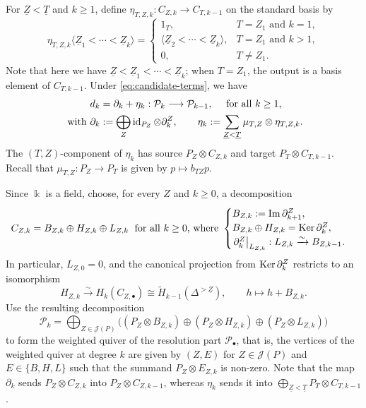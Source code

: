 \documentclass[a4paper,leqno]{amsart}
\begin{document}
For $\underline{Z}<\underline{T}$ and $k\geq1$, define $\eta_{T,Z,k}:C_{Z,k}\to C_{T,k-1}$ on the standard basis by
\[
 \eta_{T,Z,k}\langle \underline{Z}_1<\cdots<\underline{Z}_k\rangle
 =
 \begin{cases}
  1_T,&T=Z_1\text{ and }k=1,\\
  \langle \underline{Z}_2<\cdots<\underline{Z}_k\rangle,
       &T=Z_1\text{ and }k>1,\\
  0,&T\neq Z_1.
 \end{cases}
\]
Note that here we have $\underline{Z}<\underline{Z}_1<\cdots<\underline{Z}_k$; when $T=Z_1$, the output is a basis element of $C_{T,k-1}$. 
Under \eqref{eq:candidate-terms},  we have
\[
 \begin{aligned}
 d_k&=\partial_k+\eta_k:
       \mathcal P_k\longrightarrow\mathcal P_{k-1}, \quad \text{ for all $k\ge 1$,}\\
 \text{ with } \partial_k&:=\bigoplus_Z\operatorname{id}_{P_Z}\otimes\partial^Z_k,
 \qquad
 \eta_k:=\sum_{\underline{Z}<\underline{T}}\mu_{T,Z}\otimes\eta_{T,Z,k}.
 \end{aligned}
\]
The $(T,Z)$-component of $\eta_k$ has source $P_Z\otimes C_{Z,k}$ and target $P_T\otimes C_{T,k-1}$. Recall that $\mu_{T,Z}:P_Z\to P_T$ is given by $p\mapsto b_{TZ}p$.


Since $\Bbbk$ is a field, choose, for every $Z$ and $k\geq0$, a decomposition
\begin{equation}
 C_{Z,k}=B_{Z,k}\oplus H_{Z,k}\oplus L_{Z,k}\;
\text{ for all $k\ge 0$, where } 
\begin{cases}
    B_{Z,k}:=\operatorname{Im}\partial^Z_{k+1},\\
    B_{Z,k}\oplus H_{Z,k}=\operatorname{Ker}\partial^Z_k,\\
    \left.\partial^Z_k\right|_{L_{Z,k}}:
 L_{Z,k}\xrightarrow{\sim}B_{Z,k-1}.
 \end{cases}
 \label{eq:homology-splitting}
\end{equation}
In particular, $L_{Z,0}=0$, and the canonical projection from $\operatorname{Ker} \partial_k^Z$ restricts to an isomorphism
\[
 H_{Z,k}\xrightarrow{\sim}H_k(C_{Z,\bullet})
 \cong\widetilde H_{k-1}(\Delta^{>\underline{Z}}),\qquad h\longmapsto h+B_{Z,k}.
\]
Use the resulting decomposition
\[
 \mathcal P_k=\bigoplus_{Z\in\mathcal J(P)}
 \bigl((P_Z\otimes B_{Z,k})\oplus
       (P_Z\otimes H_{Z,k})\oplus
       (P_Z\otimes L_{Z,k})\bigr)
\]
to form the weighted quiver of the resolution part $\mathcal P_\bullet$, that is, the vertices of the weighted quiver at degree $k$ are given by $(Z,E)$ for $Z\in\mathcal{J}(P)$ and $E\in\{B,H,L\}$ such that the summand $P_Z\otimes E_{Z,k}$ is non-zero.  Note that the map $\partial_k$ sends $P_Z\otimes C_{Z,k}$ into $P_Z\otimes C_{Z,k-1}$, whereas $\eta_k$ sends it into $\bigoplus_{\underline{Z}<\underline{T}}P_T\otimes C_{T,k-1}$.
\end{document}
